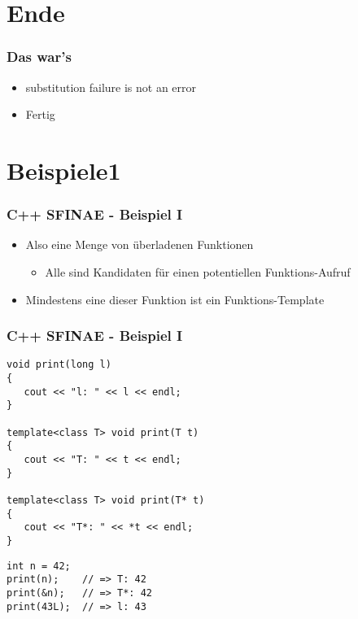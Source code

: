 \documentclass{beamer}
\begin{document}
\section{Ende} 
\begin{frame}
\frametitle{Das war's}
\begin{itemize}
\item \glqq{} substitution failure is not an error\grqq
\item Fertig
\end{itemize}
\end{frame}


\section{Beispiele1} 
\begin{frame}
\frametitle{C++ SFINAE - Beispiel I}

\begin{itemize}
\item Also eine Menge von überladenen Funktionen
\begin{itemize}
\item Alle sind Kandidaten für einen potentiellen Funktions-Aufruf
\end{itemize}

\item Mindestens eine dieser Funktion ist ein Funktions-Template
\end{itemize}

\end{frame}

\begin{frame}[fragile]
\frametitle{C++ SFINAE - Beispiel I}
\begin{lstlisting}
void print(long l) 
{ 
   cout << "l: " << l << endl; 
}

template<class T> void print(T t)
{
   cout << "T: " << t << endl;
}

template<class T> void print(T* t)
{
   cout << "T*: " << *t << endl;
}
\end{lstlisting}


\begin{lstlisting}
int n = 42;
print(n);    // => T: 42
print(&n);   // => T*: 42
print(43L);  // => l: 43
\end{lstlisting}
\end{frame}
\end{document}
